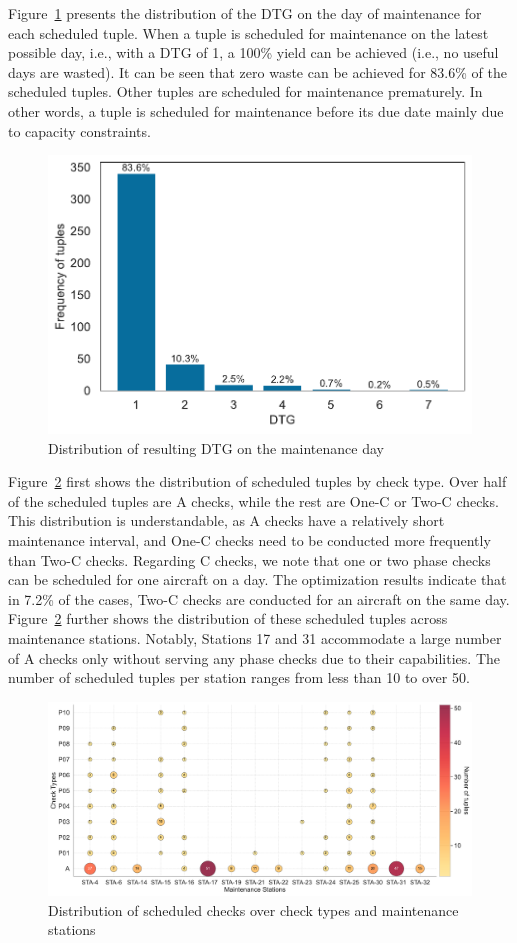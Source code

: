 Figure~\ref{fig:dtg_distribution} presents the distribution of the DTG on the day of maintenance for each scheduled tuple. When a tuple is scheduled for maintenance on the latest possible day, i.e., with a DTG of 1, a 100\% yield can be achieved (i.e., no useful days are wasted). It can be seen that zero waste can be achieved for 83.6\% of the scheduled tuples. Other tuples are scheduled for maintenance prematurely. In other words, a tuple is scheduled for maintenance before its due date mainly due to capacity constraints.

\begin{figure}[htbp]
    \centering
    \includegraphics[width=0.6\linewidth]{dtg_hist.pdf}
    \caption{Distribution of resulting DTG on the maintenance day}
    \label{fig:dtg_distribution}
\end{figure}

Figure~\ref{fig:tuples_stat} first shows the distribution of scheduled tuples by check type. Over half of the scheduled tuples are A checks, while the rest are One-C or Two-C checks. This distribution is understandable, as A checks have a relatively short maintenance interval, and One-C checks need to be conducted more frequently than Two-C checks. Regarding C checks, we note that one or two phase checks can be scheduled for one aircraft on a day. The optimization results indicate that in 7.2\% of the cases, Two-C checks are conducted for an aircraft on the same day. Figure~\ref{fig:tuples_stat} further shows the distribution of these scheduled tuples across maintenance stations. Notably, Stations 17 and 31 accommodate a large number of A checks only without serving any phase checks due to their capabilities. The number of scheduled tuples per station ranges from less than 10 to over 50.


\begin{figure}[htbp]
    \centering    
    \includegraphics[width=\linewidth]{check_a_sta.pdf}
    \caption{Distribution of scheduled checks over check types and maintenance stations}
    \label{fig:tuples_stat}
\end{figure}


